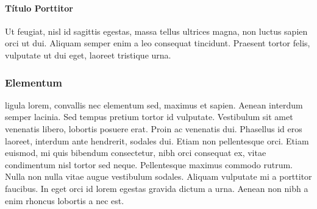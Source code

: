 \paragraph{Título Porttitor}

Ut feugiat, nisl id sagittis egestas, massa tellus ultrices magna, non luctus sapien orci ut dui. Aliquam semper enim a leo consequat tincidunt. Praesent tortor felis, vulputate ut dui eget, laoreet tristique urna.

\subsubsection{Elementum}

\textcite{andre2005estudo} ligula lorem, convallis nec elementum sed, maximus et sapien. Aenean interdum semper lacinia. Sed tempus pretium tortor id vulputate. Vestibulum sit amet venenatis libero, lobortis posuere erat. Proin ac venenatis dui. Phasellus id eros laoreet, interdum ante hendrerit, sodales dui. Etiam non pellentesque orci. Etiam euismod, mi quis bibendum consectetur, nibh orci consequat ex, vitae condimentum nisl tortor sed neque. Pellentesque maximus commodo rutrum. Nulla non nulla vitae augue vestibulum sodales. Aliquam vulputate mi a porttitor faucibus. In eget orci id lorem egestas gravida dictum a urna. Aenean non nibh a enim rhoncus lobortis a nec est.